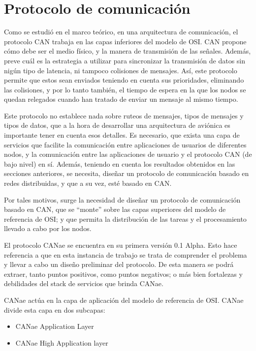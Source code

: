 \section{Protocolo de comunicación}\label{sec:protocolo_communicacion}
Como se estudió en el marco teórico, en una arquitectura
de comunicación, el protocolo CAN trabaja en las
capas inferiores del modelo de OSI. CAN propone cómo debe ser
el medio físico, y la manera de transmisión de las señales.
Además, preve cuál es la estrategia a utilizar  para sincronizar
la transmisión de datos sin nigún tipo de latencia, ni tampoco
colisiones de mensajes. Así, este protocolo permite que estos
sean enviados teniendo en cuenta sus prioridades, eliminando las colisiones, y
por lo tanto también, el tiempo de espera en la que los nodos se quedan
relegados cuando han tratado de enviar un mensaje al mismo tiempo.

Este protocolo no establece nada sobre ruteos de mensajes, tipos de mensajes y
tipos de datos, que a la hora de desarrollar una arquitectura de aviónica es
importante tener en cuenta esos detalles. Es necesario, que exista una
capa de servicios que facilite la comunicación entre aplicaciones de usuarios
de diferentes nodos, y la comunicación entre las aplicaciones de usuario
y el protocolo CAN (de bajo nivel) en sí.
Además, teniendo en cuenta los resultados obtenidos en las secciones
anteriores, se necesita, diseñar un protocolo de comunicación
basado en redes distribuidas, y que a su vez, esté basado en CAN.

Por tales motivos, surge la necesidad
de diseñar un protocolo de comunicación basado en CAN, que se ``monte'' sobre
las capas superiores del modelo de referencia de OSI; y que permita
la distribución de las tareas y el procesamiento llevado a cabo
por los nodos. 

El protocolo CANae se encuentra en su primera versión 0.1 Alpha. Esto hace
referencia a que en esta instancia de trabajo se trata de comprender
el problema y llevar a cabo un diseño preliminar del protocolo. De esta
manera se podrá extraer, tanto puntos positivos, como puntos negativos; o
más bien fortalezas y debilidades del stack de servicios que brinda CANae.

CANae actúa en la capa de aplicación del modelo de referencia de OSI. CANae
divide esta capa en dos subcapas:
\begin{itemize}
\item CANae Application Layer
\item CANae High Application layer
\end{itemize}

